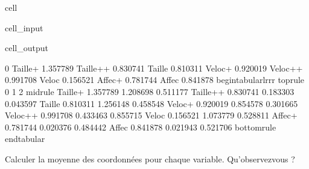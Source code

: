 \documentclass[letterpaper,10pt,french]{sphinxmanual}
\begin{document}
\begin{sphinxuseclass}{cell}
\begin{sphinxuseclass}{cell_input}
\begin{sphinxVerbatim}[commandchars=\\\{\}]
\PYG{p}{[}\PYG{p}{]}
\end{sphinxVerbatim}

\end{sphinxuseclass}
\begin{sphinxuseclass}{cell_output}
\begin{sphinxVerbatim}[commandchars=\\\{\}]
                 0
Taille+   1.357789
Taille++ \PYGZhy{}0.830741
Taille\PYGZhy{}   0.810311
Veloc+    0.920019
Veloc++  \PYGZhy{}0.991708
Veloc\PYGZhy{}    0.156521
Affec+    0.781744
Affec\PYGZhy{}   \PYGZhy{}0.841878
\PYGZbs{}begin\PYGZob{}tabular\PYGZcb{}\PYGZob{}lrrr\PYGZcb{}
\PYGZbs{}toprule
\PYGZob{}\PYGZcb{} \PYGZam{}         0 \PYGZam{}         1 \PYGZam{}         2 \PYGZbs{}\PYGZbs{}
\PYGZbs{}midrule
Taille+  \PYGZam{}  1.357789 \PYGZam{} \PYGZhy{}1.208698 \PYGZam{}  0.511177 \PYGZbs{}\PYGZbs{}
Taille++ \PYGZam{} \PYGZhy{}0.830741 \PYGZam{} \PYGZhy{}0.183303 \PYGZam{}  0.043597 \PYGZbs{}\PYGZbs{}
Taille\PYGZhy{}  \PYGZam{}  0.810311 \PYGZam{}  1.256148 \PYGZam{} \PYGZhy{}0.458548 \PYGZbs{}\PYGZbs{}
Veloc+   \PYGZam{}  0.920019 \PYGZam{} \PYGZhy{}0.854578 \PYGZam{}  0.301665 \PYGZbs{}\PYGZbs{}
Veloc++  \PYGZam{} \PYGZhy{}0.991708 \PYGZam{} \PYGZhy{}0.433463 \PYGZam{} \PYGZhy{}0.855715 \PYGZbs{}\PYGZbs{}
Veloc\PYGZhy{}   \PYGZam{}  0.156521 \PYGZam{}  1.073779 \PYGZam{}  0.528811 \PYGZbs{}\PYGZbs{}
Affec+   \PYGZam{}  0.781744 \PYGZam{} \PYGZhy{}0.020376 \PYGZam{} \PYGZhy{}0.484442 \PYGZbs{}\PYGZbs{}
Affec\PYGZhy{}   \PYGZam{} \PYGZhy{}0.841878 \PYGZam{}  0.021943 \PYGZam{}  0.521706 \PYGZbs{}\PYGZbs{}
\PYGZbs{}bottomrule
\PYGZbs{}end\PYGZob{}tabular\PYGZcb{}
\end{sphinxVerbatim}

\end{sphinxuseclass}
\end{sphinxuseclass}
\sphinxAtStartPar
Calculer la moyenne des  coordonnées pour chaque variable. Qu’observez\sphinxhyphen{}vous ?
\end{document}
